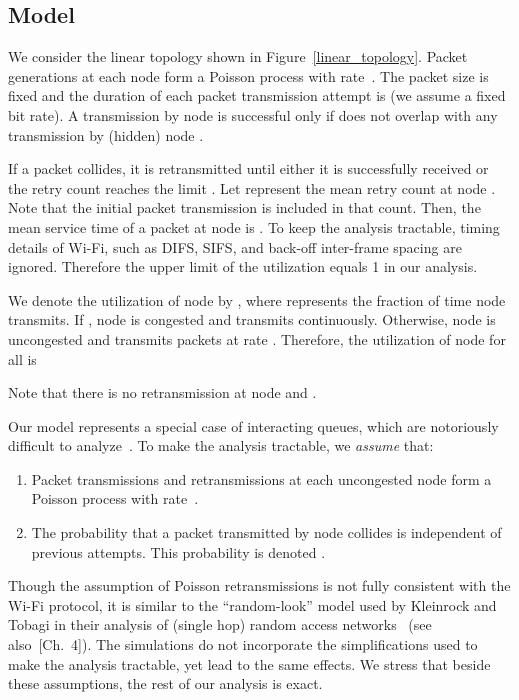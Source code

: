 \documentclass{IEEEtran}
\begin{document}
\subsection{Model}
\label{queueing_model}

We consider the linear topology shown in Figure~\ref{linear_topology}. Packet generations at each node  form a
Poisson process with rate~. The packet size is fixed and the duration of each packet transmission attempt is  (we assume a fixed bit
rate). A transmission by node  is successful only if does not overlap with any transmission by (hidden) node .


If a packet collides, it is retransmitted until either it is successfully received or the retry count reaches the limit .  Let 
represent the mean retry count at node . Note that the initial packet transmission is included in that count.   Then, the mean service time of a packet at node  is . To keep the analysis
tractable, timing details of Wi-Fi, such as DIFS, SIFS, and back-off inter-frame spacing are ignored. Therefore the upper limit of the utilization equals 1 in our analysis.

We denote the utilization of node  by , where  represents the fraction of time node  transmits. If ,  node
 is congested and transmits continuously. Otherwise, node  is uncongested and transmits packets at rate .
Therefore, the utilization of node  for all  is

Note that there is no retransmission at node  and .


Our model represents a special case of interacting queues, which are notoriously difficult to analyze~\cite{Ephremides09}. To make the analysis
tractable, we \emph{assume} that:
\begin{enumerate}
\item Packet transmissions and retransmissions at each uncongested node  form a Poisson process with rate~.\label{poisson arrival}
\item The probability that a packet transmitted by node  collides is independent of previous attempts. This probability is denoted
    .\label{independence}
\end{enumerate}


Though the assumption of Poisson retransmissions is not fully consistent with the Wi-Fi protocol, it is similar to the ``random-look'' model used by Kleinrock and Tobagi in their analysis of (single hop) random access
networks~\cite{kleinrock1975packet} (see also~\cite{bertsekas1992data}[Ch.\ 4]).
The simulations do not incorporate the simplifications used to make the analysis tractable, yet lead to the same effects.
 We stress that beside these assumptions, the rest of our analysis is exact.
\end{document}
